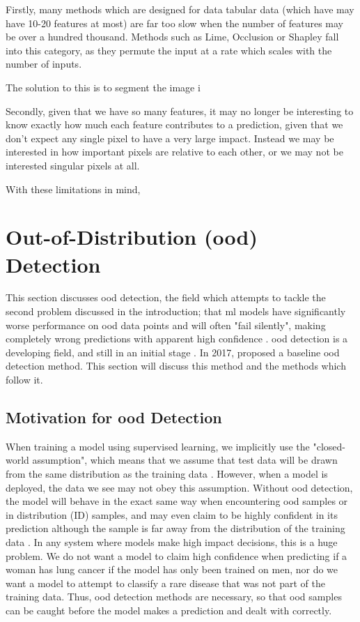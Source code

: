 \documentclass[UKenglish]{uiomasterthesis} %
\theoremstyle{definition}
\begin{document}
Firstly, many methods which are designed for data tabular data (which have may have 10-20 features at most) are far too slow when the number of features may be over a hundred thousand. Methods such as Lime, Occlusion or Shapley fall into this category, as they permute the input at a rate which scales with the number of inputs.

The solution to this is to segment the image i

Secondly, given that we have so many features, it may no longer be interesting to know exactly how much each feature contributes to a prediction, given that we don't expect any single pixel to have a very large impact. Instead we may be interested in how important pixels are relative to each other, or we may not be interested singular pixels at all.

With these limitations in mind,



\section{Out-of-Distribution (\ac{ood}) Detection} \label{ood_intro}

This section discusses \ac{ood} detection, the field which attempts to tackle the second problem discussed in the introduction; that \ac{ml} models have significantly worse performance on \ac{ood} data points and will often "fail silently", making completely wrong predictions with apparent high confidence \cite{adversarial}. \ac{ood} detection is a developing field, and still in an initial stage \cite{ooddl}. In 2017, \cite{oodbaseline} proposed a baseline \ac{ood} detection method. This section will discuss this method and the methods which follow it.

\subsection{Motivation for \ac{ood} Detection}

When training a model using supervised learning, we implicitly use the "closed-world assumption", which means that we assume that test data will be drawn from the same distribution as the training data \cite{oodoverview}. However, when a model is deployed, the data we see may not obey this assumption. Without \ac{ood} detection, the model will behave in the exact same way when encountering \ac{ood} samples or in distribution (ID) samples, and may even claim to be highly confident in its prediction although the sample is far away from the distribution of the training data \cite[1]{energy}. In any system where models make high impact decisions, this is a huge problem. We do not want a model to claim high confidence when predicting if a woman has lung cancer if the model has only been trained on men, nor do we want a model to attempt to classify a rare disease that was not part of the training data. Thus, \ac{ood} detection methods are necessary, so that \ac{ood} samples can be caught before the model makes a prediction and dealt with correctly.
\end{document}
